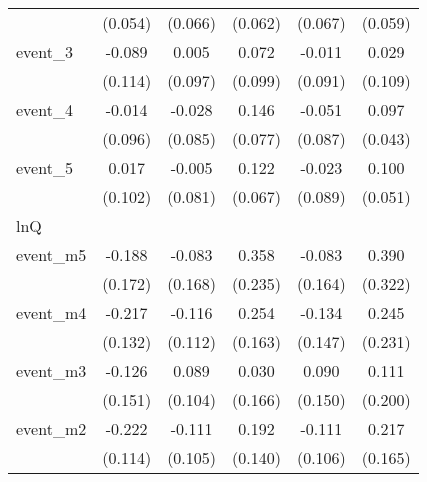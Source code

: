 {\begin{tabular}{l*{5}{c}}
            &     (0.054)         &     (0.066)         &     (0.062)         &     (0.067)         &     (0.059)         \\
[1em]
event\_3     &      -0.089         &       0.005         &       0.072         &      -0.011         &       0.029         \\
            &     (0.114)         &     (0.097)         &     (0.099)         &     (0.091)         &     (0.109)         \\
[1em]
event\_4     &      -0.014         &      -0.028         &       0.146         &      -0.051         &       0.097\sym{*}  \\
            &     (0.096)         &     (0.085)         &     (0.077)         &     (0.087)         &     (0.043)         \\
[1em]
event\_5     &       0.017         &      -0.005         &       0.122         &      -0.023         &       0.100\sym{*}  \\
            &     (0.102)         &     (0.081)         &     (0.067)         &     (0.089)         &     (0.051)         \\
\hline
lnQ         &                     &                     &                     &                     &                     \\
event\_m5    &      -0.188         &      -0.083         &       0.358         &      -0.083         &       0.390         \\
            &     (0.172)         &     (0.168)         &     (0.235)         &     (0.164)         &     (0.322)         \\
[1em]
event\_m4    &      -0.217         &      -0.116         &       0.254         &      -0.134         &       0.245         \\
            &     (0.132)         &     (0.112)         &     (0.163)         &     (0.147)         &     (0.231)         \\
[1em]
event\_m3    &      -0.126         &       0.089         &       0.030         &       0.090         &       0.111         \\
            &     (0.151)         &     (0.104)         &     (0.166)         &     (0.150)         &     (0.200)         \\
[1em]
event\_m2    &      -0.222         &      -0.111         &       0.192         &      -0.111         &       0.217         \\
            &     (0.114)         &     (0.105)         &     (0.140)         &     (0.106)         &     (0.165)         \\

\end{tabular}}
